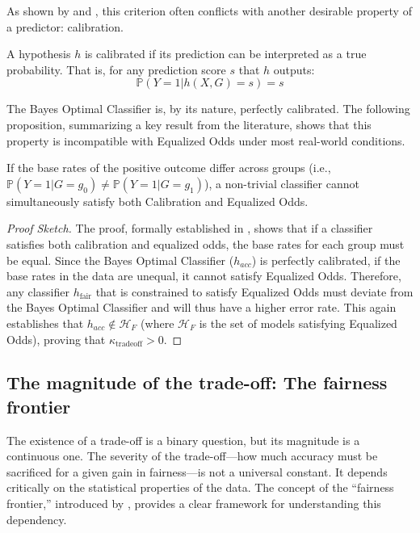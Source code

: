 As shown by \citet{Kleinberg2017} and \citet{Chouldechova2017}, this criterion often conflicts with another desirable property of a predictor: calibration.

\begin{definition}[Calibration]
A hypothesis $h$ is calibrated if its prediction can be interpreted as a true probability. That is, for any prediction score $s$ that $h$ outputs:
\begin{equation}
\mathbb{P}(Y=1 | h(X,G)=s) = s
\end{equation}
\end{definition}

The Bayes Optimal Classifier is, by its nature, perfectly calibrated. The following proposition, summarizing a key result from the literature, shows that this property is incompatible with Equalized Odds under most real-world conditions.

\begin{proposition}
If the base rates of the positive outcome differ across groups (i.e., $\mathbb{P}(Y=1 | G=g_0) \neq \mathbb{P}(Y=1 | G=g_1)$), a non-trivial classifier cannot simultaneously satisfy both Calibration and Equalized Odds.
\end{proposition}

\begin{proof}[Proof Sketch]
The proof, formally established in \citet{Kleinberg2017}, shows that if a classifier satisfies both calibration and equalized odds, the base rates for each group must be equal. Since the Bayes Optimal Classifier ($h_{acc}$) is perfectly calibrated, if the base rates in the data are unequal, it cannot satisfy Equalized Odds. Therefore, any classifier $h_{\text{fair}}$ that is constrained to satisfy Equalized Odds must deviate from the Bayes Optimal Classifier and will thus have a higher error rate. This again establishes that $h_{acc} \notin \mathcal{H}_F$ (where $\mathcal{H}_F$ is the set of models satisfying Equalized Odds), proving that $\kappa_{\text{tradeoff}} > 0$.
\end{proof}

\subsection{The magnitude of the trade-off: The fairness frontier}

The existence of a trade-off is a binary question, but its magnitude is a continuous one. The severity of the trade-off—how much accuracy must be sacrificed for a given gain in fairness—is not a universal constant. It depends critically on the statistical properties of the data. The concept of the ``fairness frontier,'' introduced by \citet{Liang2025}, provides a clear framework for understanding this dependency.

